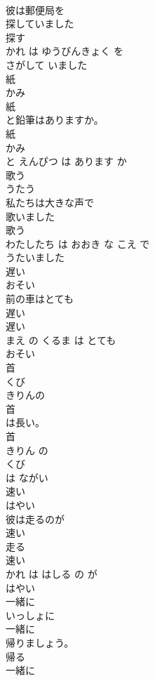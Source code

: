 \documentclass[8pt]{extreport}
\begin{document}
\begin{CJK}{UTF8}{min}
\\	彼は郵便局を
\\	探していました
\\	探す 
\\	かれ は ゆうびんきょく を 
\\	さがして いました
\\	紙	
\\	かみ	
\\	紙
\\	と鉛筆はありますか。	
\\	紙 
\\	かみ
\\	と えんぴつ は あります か	
\\	歌う	
\\	うたう	
\\	私たちは大きな声で
\\	歌いました
\\	歌う 
\\	わたしたち は おおき な こえ で 
\\	うたいました
\\	遅い	
\\	おそい	
\\	前の車はとても
\\	遅い
\\	遅い 
\\	まえ の くるま は とても 
\\	おそい
\\	首	
\\	くび	
\\	きりんの
\\	首
\\	は長い。	
\\	首 
\\	きりん の 
\\	くび
\\	は ながい	
\\	速い	
\\	はやい	
\\	彼は走るのが
\\	速い
\\	走る 
\\	速い 
\\	かれ は はしる の が 
\\	はやい
\\	一緒に	
\\	いっしょに	
\\	一緒に
\\	帰りましょう。	
\\	帰る 
\\	一緒に 

\end{CJK}
\end{document}
